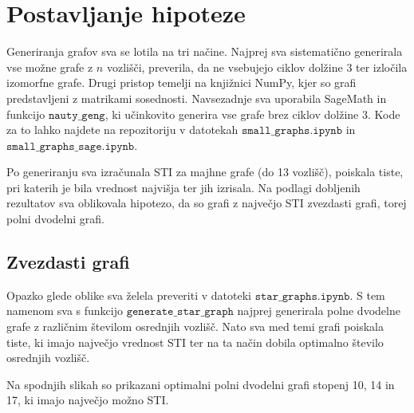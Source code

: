 \documentclass[a4paper,12pt]{article}
\begin{document}
\newpage

\section{Postavljanje hipoteze}
Generiranja grafov sva se lotila na tri načine. Najprej sva sistematično generirala vse možne grafe z $n$ vozlišči,
preverila, da ne vsebujejo ciklov dolžine 3 ter izločila izomorfne grafe. Drugi pristop temelji na knjižnici NumPy, kjer so grafi 
predstavljeni z matrikami sosednosti. Navsezadnje sva uporabila SageMath in funkcijo $\texttt{nauty\_geng}$, ki učinkovito generira
vse grafe brez ciklov dolžine 3. Kode za to lahko najdete na repozitoriju v datotekah $\texttt{small\_graphs.ipynb}$ in 
$\texttt{small\_graphs\_sage.ipynb}$.

Po generiranju sva izračunala STI za majhne grafe (do 13 vozlišč), poiskala tiste, pri katerih je bila vrednost najvišja ter jih izrisala. 
Na podlagi dobljenih rezultatov sva oblikovala hipotezo, da so grafi z največjo STI zvezdasti grafi, torej polni dvodelni grafi.

\subsection{Zvezdasti grafi}
Opazko glede oblike sva želela preveriti v datoteki $\texttt{star\_graphs.ipynb}$. S tem  namenom sva s funkcijo $\texttt{generate\_star\_graph}$
najprej generirala polne dvodelne grafe z različnim številom osrednjih vozlišč. Nato sva med temi grafi poiskala tiste, ki imajo največjo vrednost STI 
ter na ta način dobila optimalno število osrednjih vozlišč. 

Na spodnjih slikah so prikazani optimalni polni dvodelni grafi stopenj 10, 14 in 17, ki imajo največjo možno STI.
\end{document}
